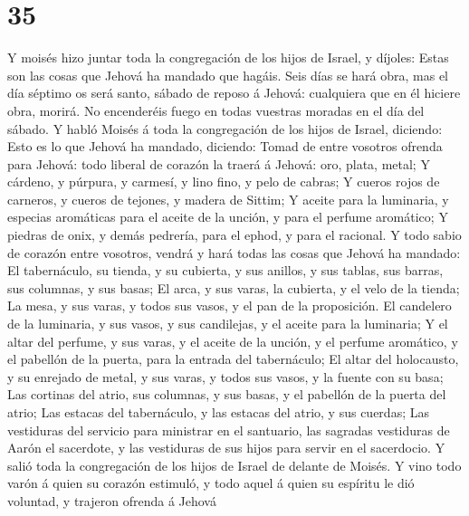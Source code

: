 \hypertarget{section-34}{%
\section{35}\label{section-34}}

 Y moisés hizo juntar toda la congregación de los hijos de
Israel, y díjoles: Estas son las cosas que Jehová ha mandado que hagáis.
 Seis días se hará obra, mas el día séptimo os será santo,
sábado de reposo á Jehová: cualquiera que en él hiciere obra, morirá.
 No encenderéis fuego en todas vuestras moradas en el día
del sábado.  Y habló Moisés á toda la congregación de los
hijos de Israel, diciendo: Esto es lo que Jehová ha mandado, diciendo:
 Tomad de entre vosotros ofrenda para Jehová: todo liberal
de corazón la traerá á Jehová: oro, plata, metal;  Y
cárdeno, y púrpura, y carmesí, y lino fino, y pelo de cabras;
 Y cueros rojos de carneros, y cueros de tejones, y madera
de Sittim;  Y aceite para la luminaria, y especias
aromáticas para el aceite de la unción, y para el perfume aromático;
 Y piedras de onix, y demás pedrería, para el ephod, y para
el racional.  Y todo sabio de corazón entre vosotros,
vendrá y hará todas las cosas que Jehová ha mandado:  El
tabernáculo, su tienda, y su cubierta, y sus anillos, y sus tablas, sus
barras, sus columnas, y sus basas;  El arca, y sus varas,
la cubierta, y el velo de la tienda;  La mesa, y sus varas,
y todos sus vasos, y el pan de la proposición.  El
candelero de la luminaria, y sus vasos, y sus candilejas, y el aceite
para la luminaria;  Y el altar del perfume, y sus varas, y
el aceite de la unción, y el perfume aromático, y el pabellón de la
puerta, para la entrada del tabernáculo;  El altar del
holocausto, y su enrejado de metal, y sus varas, y todos sus vasos, y la
fuente con su basa;  Las cortinas del atrio, sus columnas,
y sus basas, y el pabellón de la puerta del atrio;  Las
estacas del tabernáculo, y las estacas del atrio, y sus cuerdas;
 Las vestiduras del servicio para ministrar en el
santuario, las sagradas vestiduras de Aarón el sacerdote, y las
vestiduras de sus hijos para servir en el sacerdocio.  Y
salió toda la congregación de los hijos de Israel de delante de Moisés.
 Y vino todo varón á quien su corazón estimuló, y todo
aquel á quien su espíritu le dió voluntad, y trajeron ofrenda á Jehová
